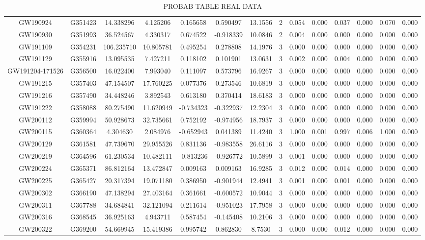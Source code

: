 \begin{table}[]
\begin{tabular}{cccccccccccccc}
GW190924 &	G351423 &	14.338296 &	4.125206 &	0.165658 &	0.590497 &	13.1556 &	2 &	0.054 &	0.000  & 0.037  & 0.000 &	0.070 &	0.000 \\
GW190930 &	G351993 &	36.524567 &	4.330317 &	0.674522 &	-0.918339 &	10.0846 &	2 &	0.004 &	0.000 & 0.000 &	 0.000 &	0.000 &	0.000 \\ 
GW191109 &	G354231 &	106.235710 & 10.805781 & 0.495254 &	0.278808 &	14.1976 &	3 &	0.000 &	0.000 & 0.000 &	0.000 &	0.000 & 	0.000 \\
GW191129 &	G355916 &	13.095535 &	7.427211 &	0.118102 &	0.101901 &	13.0631 &	3 &	0.002 &	0.000 & 0.004 & 	0.000 &	0.000 & 0.000 \\
GW191204-171526 &	G356500 &	16.022400 &	7.993040 &	0.111097 &	0.573796 &	16.9267 &	3 &	0.000 &	0.000 & 0.000 &	0.000	& 0.000 &	0.000 \\
GW191215 &	G357403 &	47.154507 &	17.760225 &	0.077376 &	0.273546 &	10.6819 &	3 &	0.000 &	0.000 & 0.000 &	0.000 &	0.000 &	0.000 \\
GW191216 &	G357490 &	34.448246 &	3.892543 &	0.613180 &	0.370414 &	18.6183 &	3 &	0.000 &	0.000 & 0.000 &	0.000 &	0.000 & 0.000 \\
GW191222 &	G358088 &	80.275490 &	11.620949 &	-0.734323 &	-0.322937 &	12.2304 &	3 &	0.000 &	0.000 & 0.000 &	0.000 &	0.000 & 0.000 \\
GW200112 &	G359994 &	50.928673 &	32.735661 &	0.752192 &	-0.974956 &	18.7937 &	3 &	0.000 &	0.000 & 0.000 &	0.000 &	0.000 & 	0.000 \\
GW200115 &	G360364 &	4.304630 &	2.084976 &	-0.652943 &	0.041389 &	11.4240 &	3 &	1.000 &	0.001 & 	0.997 &	0.006 &	1.000 &	0.000 \\
GW200129 &	G361581 &	47.739670 &	29.955526 &	0.831136 &	-0.983558 &	26.6116 &	3 &	0.000 &	0.000 & 0.000 &	0.000 &	0.000 &	0.000 \\
GW200219 &	G364596 &	61.230534 &	10.482111 &	-0.813236 &	-0.926772 &	10.5899 &	3 &	0.001 &	0.000 & 0.000 &	0.000 &	0.000 	& 0.000 \\
GW200224 &	G365371 &	86.812164 &	13.472847 &	0.009163 &	0.009163 &	16.9285 &	3 &	0.012 &	0.000 & 0.014 &	0.000 &	0.000 & 	0.000 \\
GW200225 &	G365427 &	20.317394 &	19.071180 &	0.386950 &	-0.901944 &	12.4941 &	3 &	0.001 &	0.000 & 0.001 &	0.000 &	0.000 &	0.000 \\ 
GW200302 &	G366190 &	47.138294 &	27.403164 &	0.361661 &	-0.600572 &	10.9044 &	3 &	0.000 &	0.000  & 0.000 &	0.000 &	0.000 & 0.000 \\
GW200311 &	G367788 &	34.684841 &	32.121094 &	0.211614 &	-0.951023 &	17.7958 &	3 &	0.000 &	0.000 & 0.000 &	0.000 & 0.000 & 0.000 \\   
GW200316 &	G368545 &	36.925163 &	4.943711 &	0.587454 &	-0.145408 &	10.2106 &	3 &	0.000 &	0.000  & 0.000 &	0.000 &	0.000 & 0.000 \\
GW200322 &	G369200 &	54.669945 &	15.419386 &	0.995742 &	0.862830 &	8.7530 &	3 &	0.000 &	0.000 & 0.012 &	0.000 &	0.000 &	0.000 \\


\hline
\end{tabular}
\caption{PROBAB TABLE REAL DATA}
\label{tab:real_data}
\end{table}
